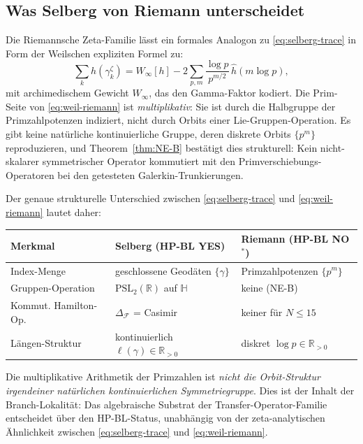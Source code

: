 \documentclass[11pt]{article}
\theoremstyle{definition}
\theoremstyle{remark}
\newcommand{\PSL}{\mathrm{PSL}}
\begin{document}
\subsection{Was Selberg von Riemann unterscheidet}
\label{sec:selberg-vs-riemann}

Die Riemannsche Zeta-Familie lässt ein formales Analogon zu \eqref{eq:selberg-trace}
in Form der Weilschen expliziten Formel zu:
\begin{equation}
\label{eq:weil-riemann}
  \sum_k h(\gamma_k^\zeta)
  = W_\infty[h]
  - 2\sum_{p,m} \frac{\log p}{p^{m/2}}\,\widehat{h}(m\log p),
\end{equation}
mit archimedischem Gewicht $W_\infty$, das den Gamma-Faktor kodiert. Die
Prim-Seite von \eqref{eq:weil-riemann} ist \emph{multiplikativ}: Sie ist
durch die Halbgruppe der Primzahlpotenzen indiziert, nicht durch Orbits einer
Lie-Gruppen-Operation. Es gibt keine natürliche kontinuierliche Gruppe,
deren diskrete Orbits $\{p^m\}$ reproduzieren, und Theorem~\ref{thm:NE-B} bestätigt
dies strukturell: Kein nicht-skalarer symmetrischer Operator kommutiert mit
den Primverschiebungs-Operatoren bei den getesteten Galerkin-Trunkierungen.

Der genaue strukturelle Unterschied zwischen \eqref{eq:selberg-trace} und
\eqref{eq:weil-riemann} lautet daher:
\begin{center}
\begin{tabular}{@{}lll@{}}
\toprule
Merkmal & Selberg (HP-BL YES) & Riemann (HP-BL NO${}^*$) \\
\midrule
Index-Menge & geschlossene Geodäten $\{\gamma\}$ &
  Primzahlpotenzen $\{p^m\}$ \\
Gruppen-Operation & $\PSL_2(\mathbb{R})$ auf $\mathbb{H}$ & keine (NE-B) \\
Kommut. Hamilton-Op. & $\Delta_\mathcal{F}$ = Casimir & keiner für $N \leq 15$ \\
Längen-Struktur & kontinuierlich $\ell(\gamma) \in \mathbb{R}_{>0}$ &
  diskret $\log p \in \mathbb{R}_{>0}$ \\
\bottomrule
\end{tabular}
\end{center}
Die multiplikative Arithmetik der Primzahlen ist \emph{nicht die Orbit-Struktur
irgendeiner natürlichen kontinuierlichen Symmetriegruppe}. Dies ist der
Inhalt der Branch-Lokalität: Das algebraische Substrat der
Transfer-Operator-Familie entscheidet über den HP-BL-Status, unabhängig
von der zeta-analytischen Ähnlichkeit zwischen \eqref{eq:selberg-trace}
und \eqref{eq:weil-riemann}.
\end{document}
